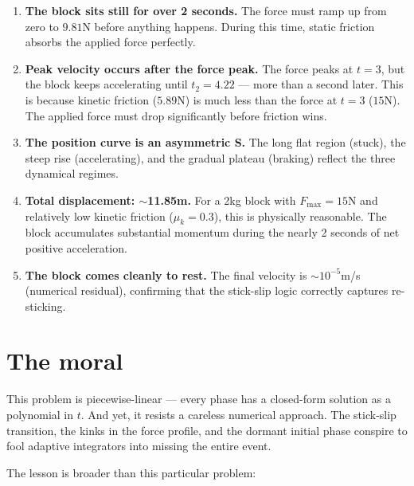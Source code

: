 \documentclass[11pt, a4paper]{article}
\begin{document}
\begin{enumerate}[itemsep=4pt]
    \item \textbf{The block sits still for over 2 seconds.}  The force
          must ramp up from zero to $9.81$\;N before anything happens.
          During this time, static friction absorbs the applied force
          perfectly.

    \item \textbf{Peak velocity occurs after the force peak.}  The force
          peaks at $t = 3$, but the block keeps accelerating until
          $t_2 = 4.22$ --- more than a second later.  This is because
          kinetic friction ($5.89$\;N) is much less than the force
          at $t = 3$ ($15$\;N).  The applied force must drop
          significantly before friction wins.

    \item \textbf{The position curve is an asymmetric S.}  The long
          flat region (stuck), the steep rise (accelerating), and the
          gradual plateau (braking) reflect the three dynamical regimes.

    \item \textbf{Total displacement: $\sim$11.85\;m.}  For a 2\;kg
          block with $F_{\max} = 15$\;N and relatively low kinetic
          friction ($\mu_k = 0.3$), this is physically reasonable.
          The block accumulates substantial momentum during the nearly
          2 seconds of net positive acceleration.

    \item \textbf{The block comes cleanly to rest.}  The final velocity
          is $\sim 10^{-5}$\;m/s (numerical residual), confirming
          that the stick-slip logic correctly captures re-sticking.
\end{enumerate}

\section{The moral}
\label{sec:moral}

This problem is piecewise-linear --- every phase has a closed-form
solution as a polynomial in $t$.  And yet, it resists a careless
numerical approach.  The stick-slip transition, the kinks in the
force profile, and the dormant initial phase conspire to fool
adaptive integrators into missing the entire event.

The lesson is broader than this particular problem:
\end{document}
